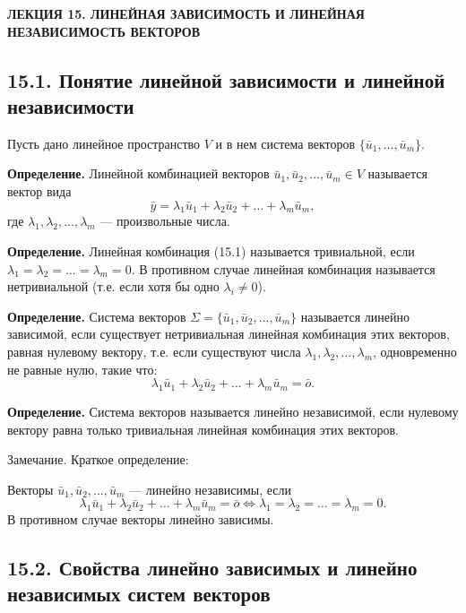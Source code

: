 \documentclass[12pt,a4paper]{article}
\newcommand{\vu}{\bar u}
\newcommand{\vy}{\bar y}
\newcommand{\vo}{\bar o}
\begin{document}
\setcounter{page}{107}

\begin{center}
  \textbf{ЛЕКЦИЯ 15. ЛИНЕЙНАЯ ЗАВИСИМОСТЬ И ЛИНЕЙНАЯ НЕЗАВИСИМОСТЬ ВЕКТОРОВ}
\end{center}

\subsection*{\textbf{15.1. Понятие линейной зависимости и линейной
независимости}}

Пусть дано линейное пространство $V$ и в нем система векторов
$\{\vu_1, \ldots, \vu_m\}$.

\textbf{Определение.} Линейной комбинацией векторов $\vu_1, \vu_2,
\ldots, \vu_m \in V$ называется вектор вида
\begin{equation}
  \vy = \lambda_1 \vu_1 + \lambda_2 \vu_2 + \ldots + \lambda_m \vu_m, \tag{15.1}
\end{equation}
где $\lambda_1, \lambda_2, \ldots, \lambda_m$ --- произвольные числа.

\textbf{Определение.} Линейная комбинация (15.1) называется
тривиальной, если $\lambda_1 = \lambda_2 = \ldots = \lambda_m = 0$. В
противном случае линейная комбинация называется нетривиальной (т.е.
если хотя бы одно $\lambda_i \ne 0$).

\textbf{Определение.} Система векторов $\Sigma = \{\vu_1, \vu_2,
\ldots, \vu_m\}$ называется линейно зависимой, если существует
нетривиальная линейная комбинация этих векторов, равная нулевому
вектору, т.е. если существуют числа $\lambda_1, \lambda_2, \ldots,
\lambda_m$, одновременно не равные нулю, такие что:
$$
\lambda_1 \vu_1 + \lambda_2 \vu_2 + \ldots + \lambda_m \vu_m = \vo.
$$

\textbf{Определение.} Система векторов называется линейно
независимой, если нулевому вектору равна только тривиальная линейная
комбинация этих векторов.

Замечание. Краткое определение:

Векторы $\vu_1, \vu_2, \ldots, \vu_m$ --- линейно независимы, если
$$
\lambda_1 \vu_1 + \lambda_2 \vu_2 + \ldots + \lambda_m \vu_m = \vo
\Leftrightarrow \lambda_1 = \lambda_2 = \ldots = \lambda_m = 0.
$$
В противном случае векторы линейно зависимы.

\subsection*{\textbf{15.2. Свойства линейно зависимых и линейно
независимых систем векторов}}
\end{document}
